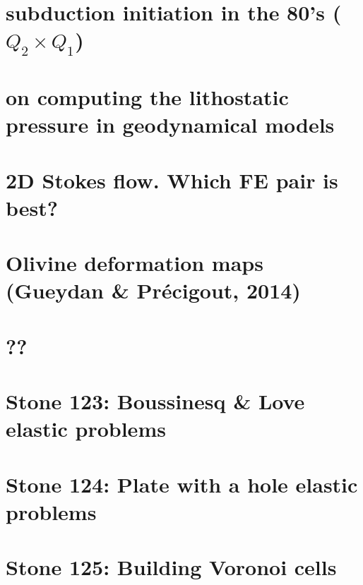 \documentclass[a4paper,11pt]{report}
\begin{document}
\chapter{subduction initiation in the 80's ($Q_2\times Q_1$) \label{f118}}

\chapter{on computing the lithostatic pressure in geodynamical models \label{f119}}

\chapter{2D Stokes flow. Which FE pair is best? \label{f120}}

\chapter{Olivine deformation maps (Gueydan \& Pr{\'e}cigout, 2014)  \label{f121}}

\chapter{??\label{f122}}

\chapter{Stone 123: Boussinesq \& Love elastic problems\label{f123}}

\chapter{Stone 124: Plate with a hole elastic problems \label{f124}}

\chapter{Stone 125: Building Voronoi cells \label{f125}}
\end{document}
